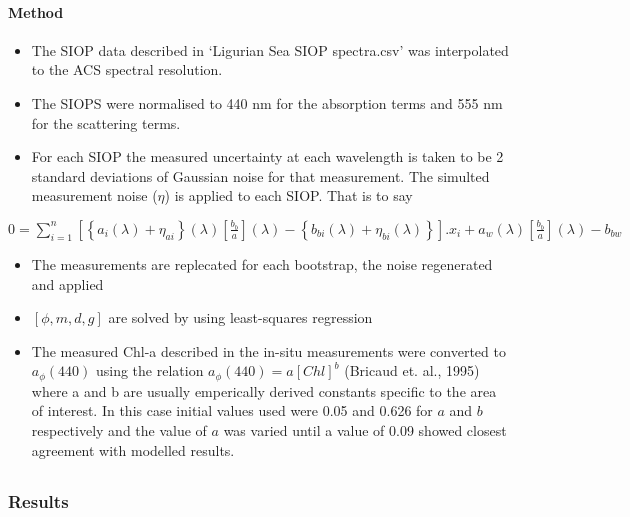 \documentclass{article}
\begin{document}
\paragraph{Method}\label{method}

\begin{itemize}
\itemsep1pt\parskip0pt
\item
  The SIOP data described in `Ligurian Sea SIOP spectra.csv' was
  interpolated to the ACS spectral resolution.
\item
  The SIOPS were normalised to 440 nm for the absorption terms and 555
  nm for the scattering terms.
\item
  For each SIOP the measured uncertainty at each wavelength is taken to
  be 2 standard deviations of Gaussian noise for that measurement. The
  simulted measurement noise ($\eta$) is applied to each SIOP. That is
  to say
\end{itemize}

$0 = \sum\limits_{i=1}^n\left[ \left\{a_i(\lambda) + \eta_{ai}\right\}(\lambda)\left[ \frac{b_b}{a}\right](\lambda) - \left\{b_{bi}(\lambda) + \eta_{bi}(\lambda) \right\} \right].x_i + a_w(\lambda)\left[\frac{b_b}{a}\right](\lambda) - b_{bw} $

\begin{itemize}
\itemsep1pt\parskip0pt
\item
  The measurements are replecated for each bootstrap, the noise
  regenerated and applied
\item
  $[\phi, m, d, g]$ are solved by using least-squares regression
\item
  The measured Chl-a described in the in-situ measurements were
  converted to $a_\phi(440)$ using the relation $a_\phi(440) = a[Chl]^b$
  (Bricaud et. al., 1995) where a and b are usually emperically derived
  constants specific to the area of interest. In this case initial
  values used were 0.05 and 0.626 for $a$ and $b$ respectively and the
  value of $a$ was varied until a value of 0.09 showed closest agreement
  with modelled results.
\end{itemize}

\subsection{}\label{section-4}

\subsubsection{Results}\label{results}
\end{document}
